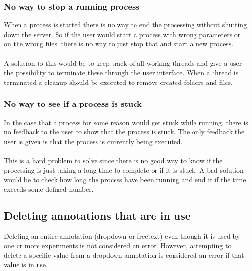 \subsubsection{No way to stop a running process}
When a process is started there is no way to end the processing without shutting down the server. So if the user would start a process with wrong parameters or on the wrong files, there is no way to just stop that and start a new process.\\
\\
A solution to this would be to keep track of all working threads and give a user the possibility to terminate these through the user interface. When a thread is terminated a cleanup should be executed to remove created folders and files.
\subsubsection{No way to see if a process is stuck}
In the case that a process for some reason would get stuck while running, there is no feedback to the user to show that the process is stuck. The only feedback the user is given is that the process is currently being executed.\\
\\
This is a hard problem to solve since there is no good way to know if the processing is just taking a long time to complete or if it is stuck. A bad solution would be to check how long the process have been running and end it if the time exceeds some defined number.

\subsection{Deleting annotations that are in use}
Deleting an entire annotation (dropdown or freetext) even though it is used by one or more experiments is not considered an error. However, attempting to delete a specific value from a dropdown annotation is considered an error if that value is in use.
